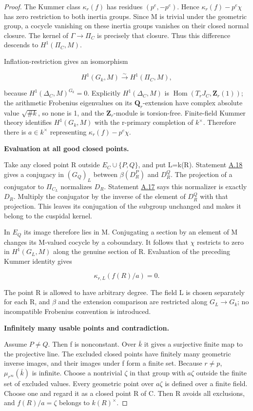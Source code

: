 \documentclass[11pt,a4paper]{article}
\newcommand{\statementref}[1]{\hyperlink{#1}{#1}}
\begin{document}
\begin{proof}
The Kummer class \({\kappa}_r(f)\) has residues \((p^e,-p^e)\). Hence \({\kappa}_r(f)-p^e{\chi}\) has zero restriction to both inertia groups. Since M is trivial under the geometric group, a cocycle vanishing on these inertia groups vanishes on their closed normal closure. The kernel of \({\Gamma}{\to}{\Pi}_C\) is precisely that closure. Thus this difference descends to \(H^1({\Pi}_C,M)\).

Inflation-restriction gives an isomorphism

\[H^1(G_k,M)\xrightarrow\sim H^1(\Pi_C,M),\]

because \(H^1(\Delta_C,M)^{G_k}=0\). Explicitly \(H^1(\Delta_C,M)\) is \(\operatorname{Hom}(T_rJ_C,\mathbf{Z}_r(1))\); the arithmetic Frobenius eigenvalues on its \(\mathbf{Q}_r\)-extension have complex absolute value \(\sqrt{\#k}\), so none is 1, and the \(\mathbf{Z}_r\)-module is torsion-free. Finite-field Kummer theory identifies \(H^1(G_k,M)\) with the r-primary completion of \(k^{\times}\). Therefore there is \(a{\in}k^{\times}\) representing \({\kappa}_r(f)-p^e{\chi}\).

\textbf{Evaluation at all good closed points.}

Take any closed point R outside \(E_C{\cup}\{P,Q\}\), and put L=k(R). Statement \statementref{A.18} gives a conjugacy in \((G_Q)_L\) between \({\beta}(D_R^P)\) and \(D_R^Q\). The projection of a conjugator to \({\Pi}_{C_L}\) normalizes \(D_R\). Statement \statementref{A.17} says this normalizer is exactly \(D_R\). Multiply the conjugator by the inverse of the element of \(D_R^Q\) with that projection. This leaves its conjugation of the subgroup unchanged and makes it belong to the cuspidal kernel.

In \(E_Q\) its image therefore lies in M. Conjugating a section by an element of M changes its M-valued cocycle by a coboundary. It follows that \({\chi}\) restricts to zero in \(H^1(G_L,M)\) along the genuine section of R. Evaluation of the preceding Kummer identity gives

\[\kappa_{r,L}(f(R)/a)=0.\]

The point R is allowed to have arbitrary degree. The field L is chosen separately for each R, and \({\beta}\) and the extension comparison are restricted along \(G_L{\to}G_k\); no incompatible Frobenius convention is introduced.

\textbf{Infinitely many usable points and contradiction.}

Assume \(P{\ne}Q\). Then f is nonconstant. Over \(\bar k\) it gives a surjective finite map to the projective line. The excluded closed points have finitely many geometric inverse images, and their images under f form a finite set. Because \(r{\ne}p\), \(\mu_{r^\infty}(\bar k)\) is infinite. Choose a nontrivial \({\zeta}\) in that group with \(a{\zeta}\) outside the finite set of excluded values. Every geometric point over \(a{\zeta}\) is defined over a finite field. Choose one and regard it as a closed point R of C. Then R avoids all exclusions, and \(f(R)/a={\zeta}\) belongs to \(k(R)^{\times}\).


\end{proof}
\end{document}
